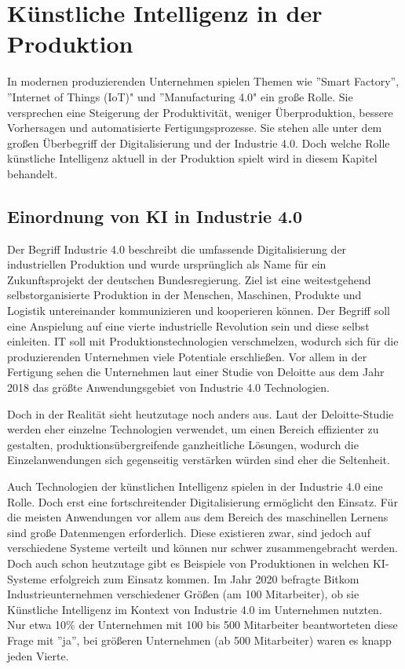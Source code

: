 \documentclass[a4paper,12pt, german]{report}
\begin{document}



\chapter{Künstliche Intelligenz in der Produktion}
In modernen produzierenden Unternehmen spielen Themen wie ''Smart Factory'', ''Internet of Things (IoT)" und ''Manufacturing 4.0" ein große Rolle. Sie versprechen eine Steigerung der Produktivität, weniger Überproduktion, bessere Vorhersagen und automatisierte Fertigungsprozesse. Sie stehen alle unter dem großen Überbegriff der Digitalisierung und der Industrie 4.0. Doch welche Rolle künstliche Intelligenz aktuell in der Produktion spielt wird in diesem Kapitel behandelt.

\section{Einordnung von KI in Industrie 4.0}
Der Begriff Industrie 4.0 beschreibt die umfassende Digitalisierung der industriellen Produktion und wurde ursprünglich als Name für ein Zukunftsprojekt der deutschen Bundesregierung. Ziel ist eine weitestgehend selbstorganisierte Produktion in der Menschen, Maschinen, Produkte und Logistik untereinander kommunizieren und kooperieren können. Der Begriff soll eine Anspielung auf eine vierte industrielle Revolution sein und diese selbst einleiten. IT soll mit Produktionstechnologien verschmelzen, wodurch sich für die produzierenden Unternehmen viele Potentiale erschließen. \cite{22}Vor allem in der Fertigung sehen die Unternehmen laut einer Studie von Deloitte aus dem Jahr 2018 das größte Anwendungsgebiet von Industrie 4.0 Technologien.\cite{23}


Doch in der Realität sieht heutzutage noch anders aus. Laut der Deloitte-Studie werden eher einzelne Technologien verwendet, um einen Bereich effizienter zu gestalten, produktionsübergreifende ganzheitliche Lösungen, wodurch die Einzelanwendungen sich gegenseitig verstärken würden sind eher die Seltenheit.

Auch Technologien der künstlichen Intelligenz spielen in der Industrie 4.0 eine Rolle. Doch erst eine fortschreitender Digitalisierung ermöglicht den Einsatz. Für die meisten Anwendungen vor allem aus dem Bereich des maschinellen Lernens sind große Datenmengen erforderlich. Diese existieren zwar, sind jedoch auf verschiedene Systeme verteilt und können nur schwer zusammengebracht werden. Doch auch schon heutzutage gibt es Beispiele von Produktionen in welchen KI-Systeme erfolgreich zum Einsatz kommen. Im Jahr 2020 befragte Bitkom Industrieunternehmen verschiedener Größen (am 100 Mitarbeiter), ob sie Künstliche Intelligenz im Kontext von Industrie 4.0 im Unternehmen nutzten. Nur etwa 10\% der Unternehmen mit 100 bis 500 Mitarbeiter beantworteten diese Frage mit ''ja'', bei größeren Unternehmen (ab 500 Mitarbeiter) waren es knapp jeden Vierte.\cite{27} 
 
\end{document}
